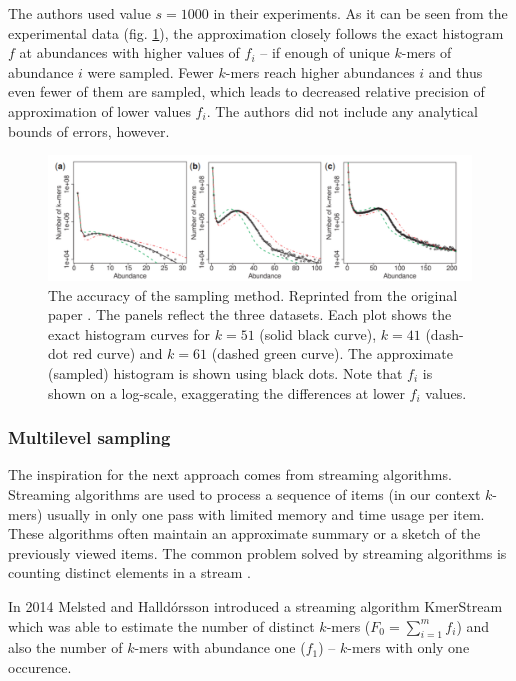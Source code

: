 The authors used value $s=1000$ in their experiments. As it can be seen from the experimental data (fig. \ref{img:kmergenie-sampling-accuracy}),
the approximation closely follows the exact histogram $f$ at abundances with higher values of $f_i$ -- if enough of unique $k$-mers of abundance 
$i$ were sampled. Fewer $k$-mers reach higher abundances $i$ and thus even fewer of them are sampled, which leads  
to decreased relative precision of approximation of lower values $f_i$. The authors did not include any analytical bounds of errors, however.

\begin{figure}
\centerline{\includegraphics[width=1.1\textwidth]{images/kmergenie-sampling-accuracy.pdf}}
\caption[Accuracy of KmerGenie Sampling]{The accuracy of the sampling method. Reprinted from the original paper \cite{Chikhi2013}. 
The panels reflect the three datasets. Each plot shows the exact
histogram curves for $k=51$ (solid black curve), $k=41$ (dash-dot red curve) and $k=61$ (dashed green curve). The approximate (sampled) histogram is
shown using black dots. Note that $f_i$ is shown on a log-scale, exaggerating the differences at lower $f_i$ values.}
\label{img:kmergenie-sampling-accuracy}
\end{figure}

\subsubsection{Multilevel sampling}
The inspiration for the next approach comes from streaming algorithms.
Streaming algorithms are used to process a sequence of items (in our context $k$-mers) usually 
in only one pass with limited memory and time usage per item. These algorithms often maintain
an approximate summary or a sketch of the previously viewed items. The common problem solved by
streaming algorithms is counting distinct elements in a stream \cite{WikiStreamingAlg}.

In 2014 Melsted and Halldórsson introduced a streaming algorithm KmerStream \cite{Melsted2014}
which was able to estimate the number of distinct $k$-mers ($F_0 = \sum_{i=1}^{m} f_i$) and also
the number of $k$-mers with abundance one ($f_1$) -- $k$-mers with only one occurence.

